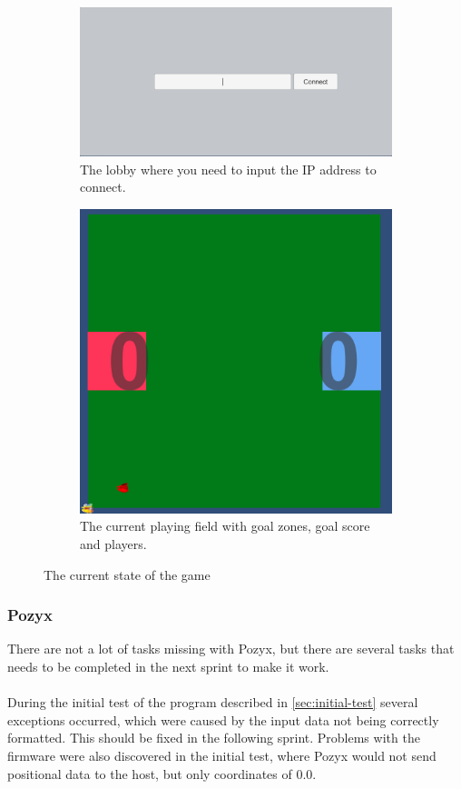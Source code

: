 \begin{figure}[H]
    \centering
    \begin{subfigure}{.5\textwidth}
        \centering
        \includegraphics[width=1\linewidth]{figures/sprint-4-lobby.PNG}
        \caption{The lobby where you need to input the IP address to connect.}
        \label{fig:sprint-4-lobby}
    \end{subfigure}
    \begin{subfigure}{.4\textwidth}
        \centering
        \includegraphics[width=.8\linewidth]{figures/sprint-4-game.PNG}
        \caption{The current playing field with goal zones, goal score and players.}
        \label{fig:sprint-4-game}
    \end{subfigure}
    \caption{The current state of the game}
    \label{fig:sprint-4-state-of-game}
\end{figure}

\subsubsection{Pozyx}
There are not a lot of tasks missing with Pozyx, but there are several tasks that needs to be completed in the next sprint to make it work.
\\\\
During the initial test of the program described in \autoref{sec:initial-test} several exceptions occurred, which were caused by the input data not being correctly formatted.
This should be fixed in the following sprint.
Problems with the firmware were also discovered in the initial test, where Pozyx would not send positional data to the host, but only coordinates of $0.0$.

